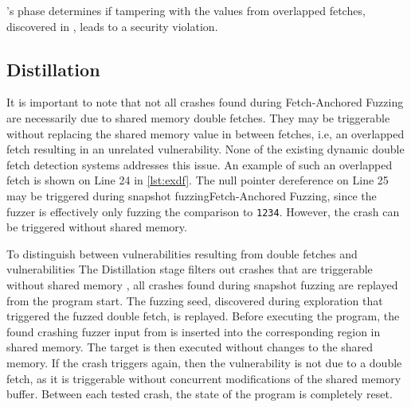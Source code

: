 \documentclass[conference]{IEEEtran} %
\newcommand{\sysname}{ScHMuzz\xspace}
\newcommand{\stageone}{Exploration\xspace}
\newcommand{\stagetwo}{Fetch-Anchored Fuzzing\xspace} %
\newcommand{\stagethree}{Distillation\xspace}
\providecommand{\DIFaddtex}[1]{{\protect\color{blue} \sf #1}} %
\providecommand{\DIFdeltex}[1]{{\protect\color{red} \scriptsize #1}} %
\providecommand{\DIFaddbegin}{} %
\providecommand{\DIFaddend}{} %
\providecommand{\DIFdelbegin}{} %
\providecommand{\DIFdelend}{} %
\providecommand{\DIFadd}[1]{\texorpdfstring{\DIFaddtex{#1}}{#1}} %
\providecommand{\DIFdel}[1]{\texorpdfstring{\DIFdeltex{#1}}{}} %
\begin{document}
\DIFdelbegin %
\DIFdel{'s }%
\DIFdel{phase determines if tampering with the values from overlapped fetches, discovered in }%
\DIFdel{, 
    leads to a security violation.
}%
\DIFdelend %

\subsection{\stagethree}
\DIFaddbegin 

\DIFaddend It is important to note that not all crashes found during \stagetwo are necessarily 
due to shared memory double fetches. 
They may be triggerable without replacing the shared 
memory value in between fetches, i.e, an overlapped fetch resulting in an unrelated vulnerability. 
None of the existing dynamic double fetch detection systems addresses this issue.
An example of such an overlapped fetch is shown on Line 24 in \autoref{lst:exdf}. The null 
pointer dereference on Line 25 may be triggered during \DIFdelbegin \DIFdel{snapshot fuzzing}\DIFdelend \DIFaddbegin \stagetwo\DIFaddend , since the fuzzer 
is effectively only fuzzing the comparison to \texttt{1234}.
However, the crash can be triggered without shared memory.
\DIFdelbegin %

\DIFdel{To distinguish between vulnerabilities resulting from double fetches and vulnerabilities }\DIFdelend \DIFaddbegin \DIFadd{The }\stagethree \DIFadd{stage filters out crashes that are }\DIFaddend triggerable without shared memory\DIFdelbegin \DIFdel{, all crashes found during snapshot fuzzing are replayed from the 
program start.
The fuzzing seed, discovered during exploration that triggered the fuzzed 
double fetch, is replayed. 
Before executing the program, 
the found crashing fuzzer input from 
}%
\DIFdel{is inserted into the corresponding region in shared memory. The target is then executed 
without changes to the shared memory. 
If the crash triggers again, then the vulnerability is not due to a double fetch,
as it is 
triggerable without concurrent modifications of the shared memory buffer. Between each tested crash, the state of the program is completely reset. 
}%
\end{document}
